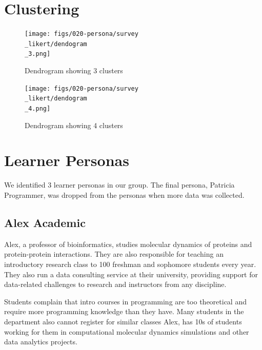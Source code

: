 \documentclass[../main.tex]{subfiles}
\begin{document}
    \section{Clustering}

        \begin{figure}[htb]
            \centering
            \texttt{[image: figs/020-persona/survey\\\_likert/dendogram\\\_3.png]}
            \caption[3 cluster dendrogram.]
            {Dendrogram showing 3 clusters
            }
            \label{fig:dendro-3}
        \end{figure}

        \begin{figure}[htb]
            \centering
            \texttt{[image: figs/020-persona/survey\\\_likert/dendogram\\\_4.png]}
            \caption[4 cluster dendrogram.]
            {Dendrogram showing 4 clusters
            }
            \label{fig:dendro-4}
        \end{figure}

    \section{Learner Personas}
    \label{se:learner-personas}

        We identified 3 learner personas in our group.
        The final persona, Patricia Programmer,
        was dropped from the personas when more data was collected.

        \subsection{Alex Academic}

            Alex, a professor of bioinformatics,
            studies molecular dynamics of proteins and protein-protein interactions.
            They are also responsible for teaching an introductory research class to 100 freshman and sophomore students every year.
            They also run a data consulting service at their university,
            providing support for data-related challenges to research and instructors from any discipline.

            Students complain that intro courses in programming are too theoretical and require more programming knowledge than they have.
            Many students in the department also cannot register for similar classes
            Alex, has 10s of students working for them in computational molecular dynamics simulations and other data analytics projects.
\end{document}
